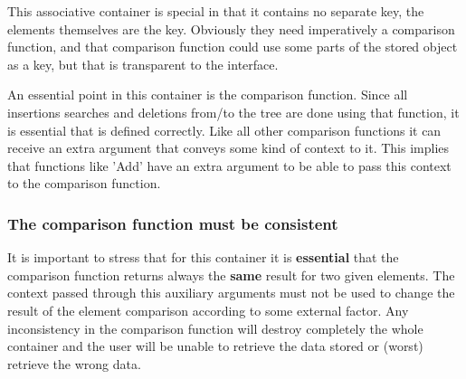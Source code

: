 \documentclass[12pt,a4paper,openany]{memoir} %
\begin{document}
{{This associative container is special in that it contains no separate key, the elements themselves are the key. Obviously they need imperatively 
a comparison function, and that comparison function could use some parts of the stored object as a key, but that is transparent to the interface.

An essential point in this container is the comparison function. Since all insertions searches and deletions from/to the tree are done using that
function, it is essential that is defined correctly. Like all other comparison functions it can receive an extra argument that conveys some kind
of context to it. This implies that functions like 'Add' have an extra argument to be able to pass this context to the comparison function.
\subsubsection{The comparison function must be consistent}
It is important to stress that for this container it is \textbf{essential} that the comparison function returns always the \textbf{same} result for
two given elements. The context passed through this auxiliary arguments must not be used to change the result of the element comparison according
to some external factor. Any inconsistency in the comparison function will destroy completely the whole container and the user will be unable
to retrieve the data stored or (worst) retrieve the wrong data.

}}
\end{document}
